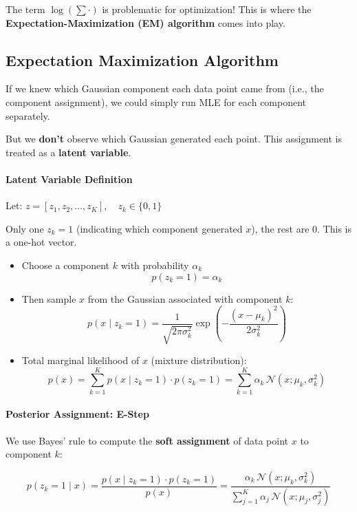 \documentclass[11pt]{article}
\begin{document}
The term $\log(\sum \cdot)$ is problematic for optimization!
This is where the \textbf{Expectation-Maximization (EM) algorithm} comes into play.

\subsection*{Expectation Maximization Algorithm}

If we knew which Gaussian component each data point came from (i.e., the component assignment), we could simply run MLE for each component separately.

\medskip

But we \textbf{don’t} observe which Gaussian generated each point. This assignment is treated as a \textbf{latent variable}.

\paragraph*{Latent Variable Definition}

Let:
$z = [z_1, z_2, \dots, z_K], \quad z_k \in \{0, 1\}$

Only one $z_k = 1$ (indicating which component generated $x$), the rest are 0. This is a one-hot vector.


\begin{itemize}
	\item Choose a component $k$ with probability $\alpha_k$
	      \[
		      p(z_k = 1) = \alpha_k
	      \]

	\item Then sample $x$ from the Gaussian associated with component $k$:
	      \[
		      p(x \mid z_k = 1) = \frac{1}{\sqrt{2\pi \sigma_k^2}} \exp\left(-\frac{(x - \mu_k)^2}{2\sigma_k^2}\right)
	      \]

	\item Total marginal likelihood of $x$ (mixture distribution):
	      \[
		      p(x) = \sum_{k=1}^{K} p(x \mid z_k = 1) \cdot p(z_k = 1)
		      = \sum_{k=1}^{K} \alpha_k \, \mathcal{N}(x; \mu_k, \sigma_k^2)
	      \]
\end{itemize}

\paragraph*{Posterior Assignment: E-Step}

We use Bayes’ rule to compute the \textbf{soft assignment} of data point $x$ to component $k$:

\[
	p(z_k = 1 \mid x) = \frac{p(x \mid z_k = 1) \cdot p(z_k = 1)}{p(x)}
	= \frac{ \alpha_k \, \mathcal{N}(x; \mu_k, \sigma_k^2) }{ \sum_{j=1}^K \alpha_j \, \mathcal{N}(x; \mu_j, \sigma_j^2) }
\]
\end{document}
